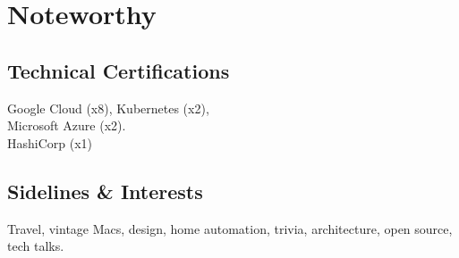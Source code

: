\documentclass[]{cvpn}
\begin{document}
\begin{multicols}{2}
\begin{eventlist}
\end{eventlist}

\section{Noteworthy}

\subsection{Technical Certifications}
Google Cloud (x8), Kubernetes (x2),\\Microsoft Azure (x2).\\
HashiCorp (x1)




\subsection{Sidelines \& Interests}
Travel, vintage Macs, design, home automation,
trivia, architecture, open source, tech talks.


\end{multicols}
\end{document}
